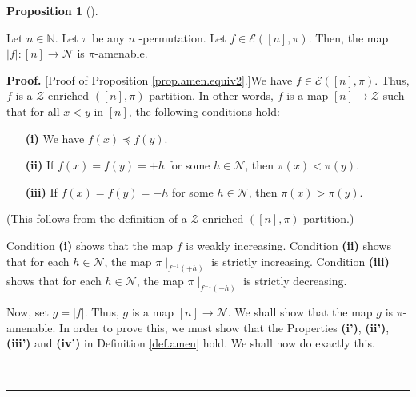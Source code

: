 \documentclass[numbers=enddot,12pt,final,onecolumn,notitlepage]{scrartcl}%
\theoremstyle{definition}
\newtheorem{prop}[theo]{Proposition}
\newenvironment{proposition}[1][]
{\begin{prop}[#1]\begin{leftbar}}
{\end{leftbar}\end{prop}}
\newenvironment{proof}[1][Proof]{\noindent\textbf{#1.} }{\ \rule{0.5em}{0.5em}}
\newenvironment{verlong}{}{}
\begin{document}
\begin{verlong}
\begin{proposition}
\label{prop.amen.equiv2}Let $n\in\mathbb{N}$. Let $\pi$ be any $n$%
-permutation. Let $f\in\mathcal{E}\left(  \left[  n\right]  ,\pi\right)  $.
Then, the map $\left\vert f\right\vert :\left[  n\right]  \rightarrow
\mathcal{N}$ is $\pi$-amenable.
\end{proposition}

\begin{proof}
[Proof of Proposition \ref{prop.amen.equiv2}.]We have $f\in\mathcal{E}\left(
\left[  n\right]  ,\pi\right)  $. Thus, $f$ is a $\mathcal{Z}$-enriched
$\left(  \left[  n\right]  ,\pi\right)  $-partition. In other words, $f$ is a
map $\left[  n\right]  \rightarrow\mathcal{Z}$ such that for all $x<y$ in
$\left[  n\right]  $, the following conditions hold:

\begin{enumerate}
\item[\textbf{(i)}] We have $f\left(  x\right)  \preccurlyeq f\left(
y\right)  $.

\item[\textbf{(ii)}] If $f\left(  x\right)  =f\left(  y\right)  =+h$ for some
$h\in\mathcal{N}$, then $\pi\left(  x\right)  <\pi\left(  y\right)  $.

\item[\textbf{(iii)}] If $f\left(  x\right)  =f\left(  y\right)  =-h$ for some
$h\in\mathcal{N}$, then $\pi\left(  x\right)  >\pi\left(  y\right)  $.
\end{enumerate}

(This follows from the definition of a $\mathcal{Z}$-enriched $\left(  \left[
n\right]  ,\pi\right)  $-partition.)

Condition \textbf{(i)} shows that the map $f$ is weakly increasing. Condition
\textbf{(ii)} shows that for each $h\in\mathcal{N}$, the map $\pi\mid
_{f^{-1}\left(  +h\right)  }$ is strictly increasing. Condition \textbf{(iii)}
shows that for each $h\in\mathcal{N}$, the map $\pi\mid_{f^{-1}\left(
-h\right)  }$ is strictly decreasing.

Now, set $g=\left\vert f\right\vert $. Thus, $g$ is a map $\left[  n\right]
\rightarrow\mathcal{N}$. We shall show that the map $g$ is $\pi$-amenable. In
order to prove this, we must show that the Properties \textbf{(i')},
\textbf{(ii')}, \textbf{(iii')} and \textbf{(iv')} in Definition
\ref{def.amen} hold. We shall now do exactly this.


\end{proof}
\end{verlong}
\end{document}
